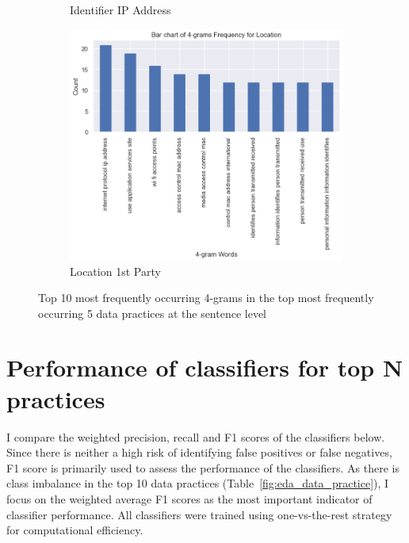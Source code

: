 \begin{figure}[!ht]
\begin{subfigure}[t]{.5\textwidth}
	  \caption{Identifier IP Address}
	\end{subfigure}
	\begin{subfigure}[t]{.5\textwidth}
		\centering
		\includegraphics[width=\linewidth]{figures/4_grams_location.png}
		\caption{Location 1st Party}
	\end{subfigure}
	\caption{Top 10 most frequently occurring 4-grams in the top most frequently occurring 5 data practices at the sentence level}
	\label{fig:4_grams_sentence}
  \end{figure}

\section{Performance of classifiers for top N practices}
I compare the weighted precision, recall and F1 scores of the classifiers below. Since there is neither a high risk of identifying false positives or false negatives, F1 score is primarily used to assess the performance of the classifiers. As there is class imbalance in the top 10 data practices (Table~\ref{fig:eda_data_practice}), I focus on the weighted average F1 scores as the most important indicator of classifier performance. All classifiers were trained using one-vs-the-rest strategy for computational efficiency.


